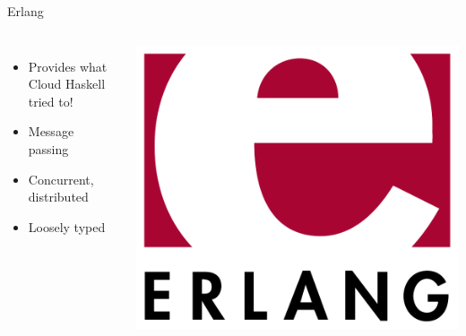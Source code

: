 \documentclass[14pt]{beamer}
\begin{document}
\begin{frame}{Erlang}
    \begin{columns}
        \begin{itemize}
            \item Provides what Cloud Haskell tried to!
            \item Message passing
            \item Concurrent, distributed
            \item Loosely typed
        \end{itemize}
        \includegraphics[width=\textwidth]{images/erlang-logo.pdf}
    \end{columns}
\end{frame}
\end{document}

